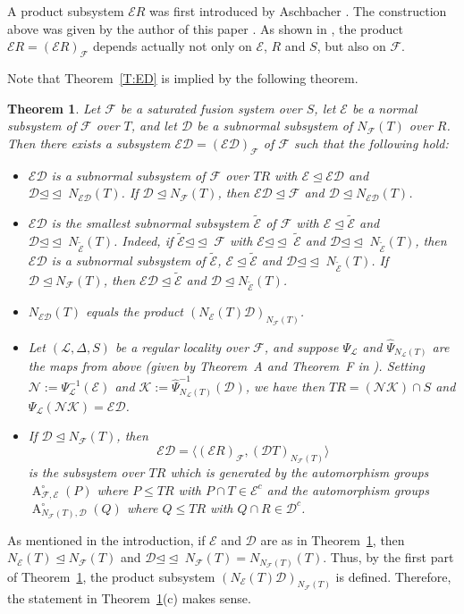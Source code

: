 \documentclass[reqno,11pt]{amsart}
\numberwithin{equation}{section}
\newtheorem{theorem}{Theorem}[section]
\theoremstyle{definition}
\newcommand{\F}{\mathcal{F}}
\newcommand{\E}{\mathcal{E}}
\renewcommand{\L}{\mathcal{L}}
\newcommand{\N}{\mathcal{N}}
\newcommand{\K}{\mathcal{K}}
\newcommand{\Ac}{\operatorname{A}^\circ}
\newcommand{\mD}{\mathcal{D}}
\newcommand{\tE}{\widetilde{\E}}
\def \<{\langle }
\def \>{\rangle }
\newcommand{\subn}{{\unlhd\!\unlhd\;}}
\begin{document}
A product subsystem $\E R$ was first introduced by Aschbacher \cite[Chapter~8]{Aschbacher:2011}. The construction above was given by the author of this paper \cite{Henke:2013}. As shown in \cite[Example~7.4]{Henke:2013}, the product $\E R=(\E R)_\F$ depends actually not only on $\E$, $R$ and $S$, but also on $\F$.

\smallskip


Note that Theorem~\ref{T:ED} is implied by the following theorem.

\begin{theorem}\label{T:ED0}
Let $\F$ be a saturated fusion system over $S$, let $\E$ be a normal subsystem of $\F$ over $T$, and let $\mD$ be a subnormal subsystem of $N_\F(T)$ over $R$. Then there exists a subsystem $\E\mD=(\E\mD)_\F$ of $\F$ such that the following hold:
\begin{itemize}
 \item [(a)] $\E\mD$ is a subnormal subsystem of $\F$ over $TR$ with $\E\unlhd\E\mD$ and $\mD\subn N_{\E\mD}(T)$. If $\mD\unlhd N_\F(T)$, then $\E\mD\unlhd\F$ and $\mD\unlhd N_{\E\mD}(T)$.
 \item [(b)] $\E\mD$ is the smallest subnormal subsystem $\tE$ of $\F$ with $\E\unlhd\tE$ and $\mD\subn N_{\tE}(T)$. Indeed, if $\tE\subn\F$ with $\E\subn\tE$ and $\mD\subn N_{\tE}(T)$, then $\E\mD$ is a subnormal subsystem of $\tE$, $\E\unlhd\tE$ and $\mD\subn N_{\tE}(T)$. If $\mD\unlhd N_\F(T)$, then $\E\mD\unlhd\tE$ and $\mD\unlhd N_{\tE}(T)$.
 \item [(c)] $N_{\E\mD}(T)$ equals the product $(N_\E(T)\mD)_{N_\F(T)}$.
 \item [(d)] Let $(\L,\Delta,S)$ be a regular locality over $\F$, and suppose $\Psi_\L$ and $\hat{\Psi}_{N_\L(T)}$ are the maps from above (given by Theorem~A and Theorem~F in \cite{Chermak/Henke}). Setting $\N:=\Psi_\L^{-1}(\E)$ and $\K:=\hat{\Psi}_{N_\L(T)}^{-1}(\mD)$, we have then $TR=(\N\K)\cap S$ and $\Psi_\L(\N\K)=\E\mD$.
 \item [(e)] If $\mD\unlhd N_\F(T)$, then
  \[\E\mD=\<(\E R)_\F,(\mD T)_{N_\F(T)}\>\] is the subsystem over $TR$ which is generated by the automorphism groups $\Ac_{\F,\E}(P)$ where $P\leq TR$ with $P\cap T\in\E^c$ and the automorphism groups $\Ac_{N_\F(T),\mD}(Q)$ where $Q\leq TR$ with $Q\cap R\in\mD^c$.
\end{itemize}
\end{theorem}

As mentioned in the introduction, if $\E$ and $\mD$ are as in Theorem~\ref{T:ED0}, then $N_\E(T)\unlhd N_\F(T)$ and $\mD\subn N_\F(T)=N_{N_\F(T)}(T)$. Thus, by the first part of Theorem~\ref{T:ED0}, the product subsystem $(N_\E(T)\mD)_{N_\F(T)}$ is defined. Therefore, the statement in  Theorem~\ref{T:ED0}(c) makes sense.
\end{document}
